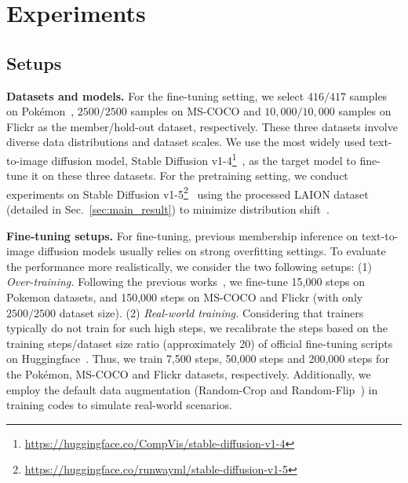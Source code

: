 \section{Experiments}


\subsection{Setups}\label{sec:setup}

\textbf{Datasets and models.} For the fine-tuning setting,
we select $416 / 417$ samples on Pokémon~\cite{Pokemon-Blip}, $2500 / 2500$ samples on MS-COCO \cite{lin2014microsoft} and $10,000 / 10,000$ samples on Flickr \cite{young2014image} as the member/hold-out dataset, respectively. These three datasets involve diverse data distributions and dataset scales.
We use the most widely used text-to-image diffusion model, Stable Diffusion v1-4\footnote{ \url{https://huggingface.co/CompVis/stable-diffusion-v1-4}}~\cite{Stable-Diffusion-v1-4}, as the target model to fine-tune it on these three datasets. 
For the pretraining setting,
we conduct experiments on Stable Diffusion v1-5\footnote{\url{https://huggingface.co/runwayml/stable-diffusion-v1-5}}~\cite{Stable-Diffusion-v1-5} using the processed LAION dataset~\cite{schuhmann2022laion} (detailed in Sec.~\ref{sec:main_result}) to minimize distribution shift~\cite{dubinski2024towards,das2024blind}.

\textbf{Fine-tuning setups.}
For fine-tuning, previous membership inference on text-to-image diffusion models usually relies on strong overfitting settings. To evaluate the performance more realistically, we consider the two following setups: (1) \textit{Over-training.} Following the previous works~\cite{duan2023diffusion, kong2023efficient, fu2023probabilistic}, we fine-tune 15,000 steps on Pokemon datasets, and 150,000 steps on MS-COCO and Flickr (with only $2500 / 2500$ dataset size). (2) \textit{Real-world training.}  Considering that trainers typically do not train for such high steps, we recalibrate the steps based on the 
training steps/dataset size ratio (approximately 20) of official fine-tuning scripts on Huggingface~\cite{text-to-image-ft}. Thus, we train 7,500 steps, 50,000 steps and 200,000 steps for the Pokémon, MS-COCO and Flickr datasets, respectively. Additionally, we employ the default data augmentation (Random-Crop and Random-Flip~\cite{text-to-image-ft-python}) in training codes \cite{text-to-image-ft-python} to simulate real-world scenarios.





